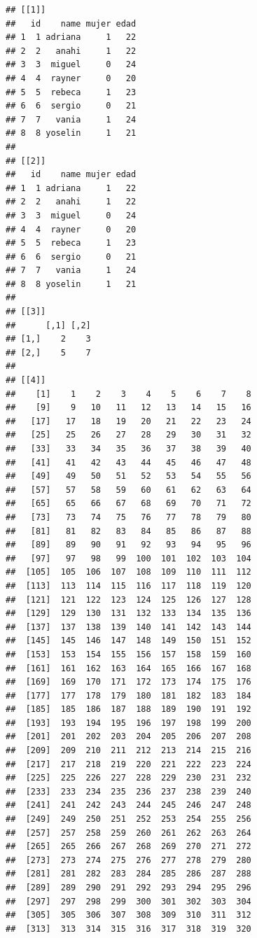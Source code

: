 \documentclass[
]{book}
\begin{document}
\begin{verbatim}
## [[1]]
##   id    name mujer edad
## 1  1 adriana     1   22
## 2  2   anahi     1   22
## 3  3  miguel     0   24
## 4  4  rayner     0   20
## 5  5  rebeca     1   23
## 6  6  sergio     0   21
## 7  7   vania     1   24
## 8  8 yoselin     1   21
## 
## [[2]]
##   id    name mujer edad
## 1  1 adriana     1   22
## 2  2   anahi     1   22
## 3  3  miguel     0   24
## 4  4  rayner     0   20
## 5  5  rebeca     1   23
## 6  6  sergio     0   21
## 7  7   vania     1   24
## 8  8 yoselin     1   21
## 
## [[3]]
##      [,1] [,2]
## [1,]    2    3
## [2,]    5    7
## 
## [[4]]
##    [1]    1    2    3    4    5    6    7    8
##    [9]    9   10   11   12   13   14   15   16
##   [17]   17   18   19   20   21   22   23   24
##   [25]   25   26   27   28   29   30   31   32
##   [33]   33   34   35   36   37   38   39   40
##   [41]   41   42   43   44   45   46   47   48
##   [49]   49   50   51   52   53   54   55   56
##   [57]   57   58   59   60   61   62   63   64
##   [65]   65   66   67   68   69   70   71   72
##   [73]   73   74   75   76   77   78   79   80
##   [81]   81   82   83   84   85   86   87   88
##   [89]   89   90   91   92   93   94   95   96
##   [97]   97   98   99  100  101  102  103  104
##  [105]  105  106  107  108  109  110  111  112
##  [113]  113  114  115  116  117  118  119  120
##  [121]  121  122  123  124  125  126  127  128
##  [129]  129  130  131  132  133  134  135  136
##  [137]  137  138  139  140  141  142  143  144
##  [145]  145  146  147  148  149  150  151  152
##  [153]  153  154  155  156  157  158  159  160
##  [161]  161  162  163  164  165  166  167  168
##  [169]  169  170  171  172  173  174  175  176
##  [177]  177  178  179  180  181  182  183  184
##  [185]  185  186  187  188  189  190  191  192
##  [193]  193  194  195  196  197  198  199  200
##  [201]  201  202  203  204  205  206  207  208
##  [209]  209  210  211  212  213  214  215  216
##  [217]  217  218  219  220  221  222  223  224
##  [225]  225  226  227  228  229  230  231  232
##  [233]  233  234  235  236  237  238  239  240
##  [241]  241  242  243  244  245  246  247  248
##  [249]  249  250  251  252  253  254  255  256
##  [257]  257  258  259  260  261  262  263  264
##  [265]  265  266  267  268  269  270  271  272
##  [273]  273  274  275  276  277  278  279  280
##  [281]  281  282  283  284  285  286  287  288
##  [289]  289  290  291  292  293  294  295  296
##  [297]  297  298  299  300  301  302  303  304
##  [305]  305  306  307  308  309  310  311  312
##  [313]  313  314  315  316  317  318  319  320

\end{verbatim}
\end{document}
